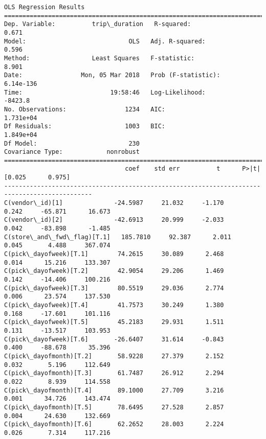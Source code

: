 \documentclass[11pt]{article}
\begin{document}
    \begin{Verbatim}[commandchars=\\\{\}]
                            OLS Regression Results                            
==============================================================================
Dep. Variable:          trip\_duration   R-squared:                       0.671
Model:                            OLS   Adj. R-squared:                  0.596
Method:                 Least Squares   F-statistic:                     8.901
Date:                Mon, 05 Mar 2018   Prob (F-statistic):          6.14e-136
Time:                        19:58:46   Log-Likelihood:                -8423.8
No. Observations:                1234   AIC:                         1.731e+04
Df Residuals:                    1003   BIC:                         1.849e+04
Df Model:                         230                                         
Covariance Type:            nonrobust                                         
==============================================================================================
                                 coef    std err          t      P>|t|      [0.025      0.975]
----------------------------------------------------------------------------------------------
C(vendor\_id)[1]              -24.5987     21.032     -1.170      0.242     -65.871      16.673
C(vendor\_id)[2]              -42.6913     20.999     -2.033      0.042     -83.898      -1.485
C(store\_and\_fwd\_flag)[T.1]   185.7810     92.387      2.011      0.045       4.488     367.074
C(pick\_dayofweek)[T.1]        74.2615     30.089      2.468      0.014      15.216     133.307
C(pick\_dayofweek)[T.2]        42.9054     29.206      1.469      0.142     -14.406     100.216
C(pick\_dayofweek)[T.3]        80.5519     29.036      2.774      0.006      23.574     137.530
C(pick\_dayofweek)[T.4]        41.7573     30.249      1.380      0.168     -17.601     101.116
C(pick\_dayofweek)[T.5]        45.2183     29.931      1.511      0.131     -13.517     103.953
C(pick\_dayofweek)[T.6]       -26.6407     31.614     -0.843      0.400     -88.678      35.396
C(pick\_dayofmonth)[T.2]       58.9228     27.379      2.152      0.032       5.196     112.649
C(pick\_dayofmonth)[T.3]       61.7487     26.912      2.294      0.022       8.939     114.558
C(pick\_dayofmonth)[T.4]       89.1000     27.709      3.216      0.001      34.726     143.474
C(pick\_dayofmonth)[T.5]       78.6495     27.528      2.857      0.004      24.630     132.669
C(pick\_dayofmonth)[T.6]       62.2652     28.003      2.224      0.026       7.314     117.216

\end{Verbatim}
\end{document}
